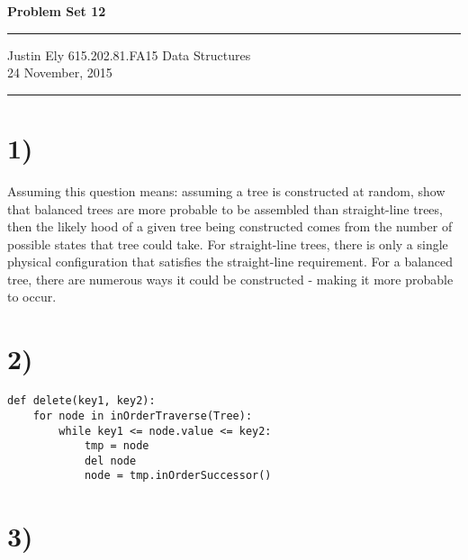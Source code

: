 \documentclass[a4paper,11pt]{article}
\begin{document}
\begin{flushright}

\vspace{1.1cm}

{\bf\Huge Problem Set 12}

\rule{0.25\linewidth}{0.5pt}

\vspace{0.5cm}
Justin Ely
\linebreak
\newline
\footnotesize{615.202.81.FA15 Data Structures \\}
\vspace{0.5cm}
24 November, 2015
\end{flushright}

\noindent\rule{\linewidth}{1.0pt}


\section*{1)}
Assuming this question means: assuming a tree is constructed at random, show that balanced trees are more probable to be assembled than straight-line trees, then the likely hood of a given tree being constructed comes from the number of possible states that tree could take.  For straight-line trees, there is only a single physical configuration that satisfies the straight-line requirement.  For a balanced tree, there are numerous ways it could be constructed - making it more probable to occur.



\section*{2)}

\begin{verbatim}
def delete(key1, key2):
    for node in inOrderTraverse(Tree):
        while key1 <= node.value <= key2:
            tmp = node
            del node
            node = tmp.inOrderSuccessor()
\end{verbatim}


\section*{3)}
\end{document}
